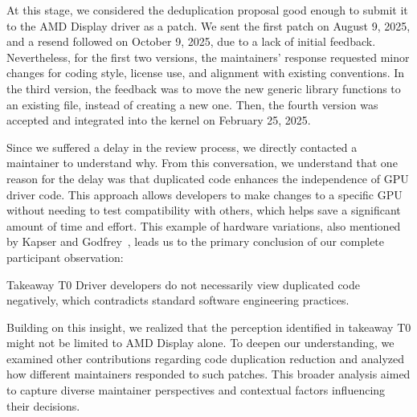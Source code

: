 \documentclass[10pt,conference]{IEEEtran}
\newenvironment{highlight-box}[1]{%
  \begin{tcolorbox}[colback=gray!10, colframe=gray!50!black, boxrule=0.5pt,
                    left=1mm, right=1mm, top=1mm, bottom=1mm, sharp corners]
  \textbf{#1:} \itshape}{\end{tcolorbox}}
\begin{document}
At this stage, we considered the deduplication proposal good enough to submit it to the AMD Display driver as a patch. We sent the first patch on August 9, 2025, and a resend followed on October 9, 2025, due to a lack of initial feedback. Nevertheless, for the first two versions, the maintainers' response requested minor changes for coding style, license use, and alignment with existing conventions. In the third version, the feedback was to move the new generic library functions to an existing file, instead of creating a new one. Then, the fourth version was accepted and integrated into the kernel on February 25, 2025.

Since we suffered a delay in the review process, we directly contacted a maintainer to understand why. From this conversation, we understand that one reason for the delay was that duplicated code enhances the independence of GPU driver code. This approach allows developers to make changes to a specific GPU without needing to test compatibility with others, which helps save a significant amount of time and effort. This example of hardware variations, also mentioned by Kapser and Godfrey~\cite{cloneharm}, leads us to the primary conclusion of our complete participant observation:
%
\begin{highlight-box}{Takeaway T0}
Driver developers do not necessarily view duplicated code negatively, which contradicts standard software engineering practices.
\end{highlight-box}

Building on this insight, we realized that the perception identified in takeaway T0 might not be limited to AMD Display alone. To deepen our understanding, we examined other contributions regarding code duplication reduction and analyzed how different maintainers responded to such patches. This broader analysis aimed to capture diverse maintainer perspectives and contextual factors influencing their decisions.
\end{document}
